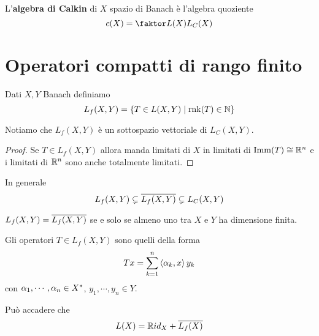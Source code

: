 \begin{definition}
L'\textbf{algebra di Calkin} di $X$ spazio di Banach \`e l'algebra quoziente
\[c(X)=\quot{L(X)}{L_C(X)}\]
\end{definition}


\section{Operatori compatti di rango finito}

\begin{definition}[]
Dati $X,Y$ Banach definiamo
\[L_f(X,Y)=\left\{{T\in L(X,Y)\mid \operatorname{rnk}(T)\in\mathbb{N}}\right\}\]
\end{definition}
\begin{remark}
Notiamo che $L_f(X,Y)$ \`e un sottospazio vettoriale di $L_C(X,Y)$.
\end{remark}
\begin{proof}
Se $T\in L_f(X,Y)$ allora manda limitati di $X$ in limitati di $\operatorname{Imm}(T)\cong \mathbb{R}^n$ e i limitati di $\mathbb{R}^n$ sono anche totalmente limitati.
\end{proof}

\begin{remark}
In generale
\[L_f(X,Y)\subsetneq\overline{L_f(X,Y)}\subsetneq L_C(X,Y)\]
\end{remark}

\begin{exercise}
$L_f(X,Y)=\overline{L_f(X,Y)}$ se e solo se almeno uno tra $X$ e $Y$ ha dimensione finita.
\end{exercise}


\begin{proposition}\label{PrFormaOperatoriRangoFinito}
    Gli operatori $T\in L_f(X,Y)$ sono quelli della forma
    \[Tx=\sum_{k=1}^n\left\langle {\alpha_k,x}\right\rangle y_k\]
    con $\alpha_1,\cdots,\alpha_n\in X^\ast$, $y_1,\cdots, y_n\in Y$.
\end{proposition}

\begin{fact}
Pu\`o accadere che
\[L(X)=\mathbb{R} id_X+\overline{L_f(X)}\]
\end{fact}


